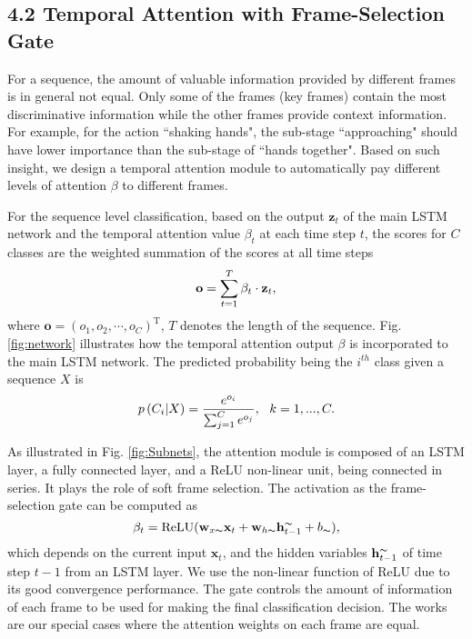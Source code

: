 \documentclass[letterpaper]{article}
\begin{document}
\subsection{4.2 Temporal Attention with Frame-Selection Gate}

For a sequence, the amount of valuable information provided by different frames is in general not equal. Only some of the frames (key frames) contain the most discriminative information while the other frames provide context information. For example, for the action ``shaking hands", the sub-stage ``approaching" should have lower importance than the sub-stage of ``hands together". Based on such insight, we design a temporal attention module to automatically pay different levels of attention $\beta$ to different frames.

For the sequence level classification, based on the output $\mathbf{z}_t$ of the main LSTM network and the temporal attention value $\beta_t$ at each time step $t$, the scores for $C$ classes are the weighted summation of the scores at all time steps
\vspace{-1mm}
\begin{equation}
	\label{equ:ot}
\vspace{-1mm}
	\mathbf{o} = \sum_{t=1}^{T}{\beta_t} \cdot \mathbf{z}_t,
\vspace{-0mm}
\end{equation}
where $\mathbf{o} = (o_1, o_2, \cdots, o_C)^\mathrm{T}$, $T$ denotes the length of the sequence. Fig. \ref{fig:network} illustrates how the temporal attention output $\beta$ is incorporated to the main LSTM network. The predicted probability being the $i^{th}$ class given a sequence $X$ is
\begin{equation}
\vspace{-2mm}
\label{equ:pred}
p\left( C_i | \mathsfsl{X} \right) = \frac{e^{o_i}}{\sum_{j=1}^C e^{o_j}},~~k = 1,..., C.
\end{equation}


As illustrated in Fig. \ref{fig:Subnets}, the attention module is composed of an LSTM layer, a fully connected layer, and a ReLU non-linear unit, being connected in series. It plays the role of soft frame selection. The activation as the frame-selection gate can be computed as
\begin{equation}
\label{equ:tem_att}
\beta_t = \text{ReLU}(\mathbf{w}_{x\thicksim}\mathbf{x}_t + \mathbf{w}_{h\thicksim}\mathbf{h}_{t-1}^{\thicksim} + b_{\thicksim}),
\end{equation}
which depends on the current input $\mathbf{x}_t$, and the hidden variables $\mathbf{h}_{t-1}^{\thicksim}$ of time step $t-1$ from an LSTM layer. We use the non-linear function of ReLU due to its good convergence performance. The gate controls the amount of information of each frame to be used for making the final classification decision. The works \cite{CVPR15HRNN,zhu2015co} are our special cases where the attention weights on each frame are equal.
\end{document}
